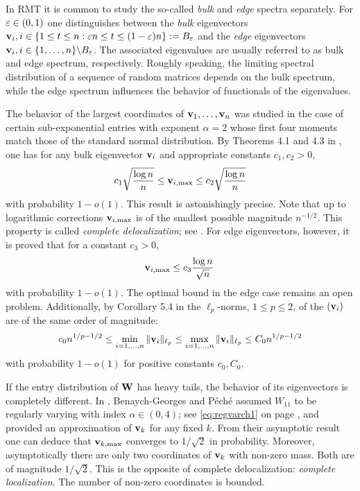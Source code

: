 In RMT it is common to study the so-called {\em bulk} and {\em edge} spectra separately.
For $\varepsilon\in (0,1)$ one distinguishes between the {\em bulk} eigenvectors ${\mathbf v}_i, i\in \{1\le t\le n: \varepsilon n \le t \le (1-\varepsilon) n\} :=B_\varepsilon$ and the {\em edge} eigenvectors ${\mathbf v}_i, i \in \{1,\ldots,n\} \backslash B_\varepsilon$. The associated eigenvalues are usually referred to as bulk and edge spectrum, respectively. Roughly speaking, the limiting spectral distribution of a sequence of random matrices depends on the bulk spectrum, while the edge spectrum influences the behavior of functionals of the eigenvalues.
\par

The behavior of the largest coordinates of ${\mathbf v}_1,\ldots, {\mathbf v}_n$ was studied in the case of certain sub-exponential entries with exponent $\alpha=2$ whose first four moments match those of the standard normal distribution. 
By Theorems 4.1 and 4.3 in \cite{orourke:vu:wang:2016}, one has for any bulk eigenvector ${\mathbf v}_i$ and appropriate constants $c_1,c_2>0$,
\begin{equation*}
c_1 \sqrt{\frac{\log n}{n}} \le {\mathbf v}_{i,\text{max}}\le c_2 \sqrt{\frac{\log n}{n}}
\end{equation*}
with probability $1-o(1)$. This result is astonishingly precise. Note that up to logarithmic corrections ${\mathbf v}_{i,\text{max}}$ is of the smallest possible magnitude $n^{-1/2}$. This property is called {\em complete delocalization}; see \cite{rudelson:vershynin:2015}.
For edge eigenvectors, however, it is proved that for a constant $c_3>0$,
\begin{equation*}
{\mathbf v}_{i,\text{max}}\le c_3 \frac{\log n}{\sqrt{n}}\,
\end{equation*}
with probability $1-o(1)$.
The optimal bound in the edge case remains an open problem. Additionally, by Corollary 5.4 in \cite{orourke:vu:wang:2016} the $\ell_p$-norms, $1\le p\le2$, of the $({\mathbf v}_i)$ are of the same order of magnitude:
\begin{equation}\label{eq:lpefgs}
c_0 n^{1/p-1/2}\le \min_{i=1,\ldots,n} \| {\mathbf v}_i\|_{\ell_p} \le \max_{i=1,\ldots,n} \| {\mathbf v}_i\|_{\ell_p}  \le C_0 n^{1/p-1/2}
\end{equation}
with probability $1-o(1)$ for positive constants $c_0,C_0$.
\par

If the entry distribution of ${\mathbf W}$ has heavy tails, the behavior of its eigenvectors is completely different. In \cite{benaych:peche}, Benaych-Georges and P\'{e}ch\'{e} assumed $W_{11}$ to be regularly varying with index $\alpha\in (0,4)$; see \eqref{eq:regvarch1} on page \pageref{eq:regvarch1}, and provided an approximation of ${\mathbf v}_k$ for any fixed $k$. From their asymptotic result one can deduce that ${\mathbf v}_{k,\text{max}}$ converges to $1/\sqrt{2}$ in probability. Moreover, asymptotically there are only two coordinates of ${\mathbf v}_k$ with non-zero mass. Both are of magnitude $1/\sqrt{2}$. This is the opposite of complete delocalization: {\em complete localization}. The number of non-zero coordinates is bounded.

